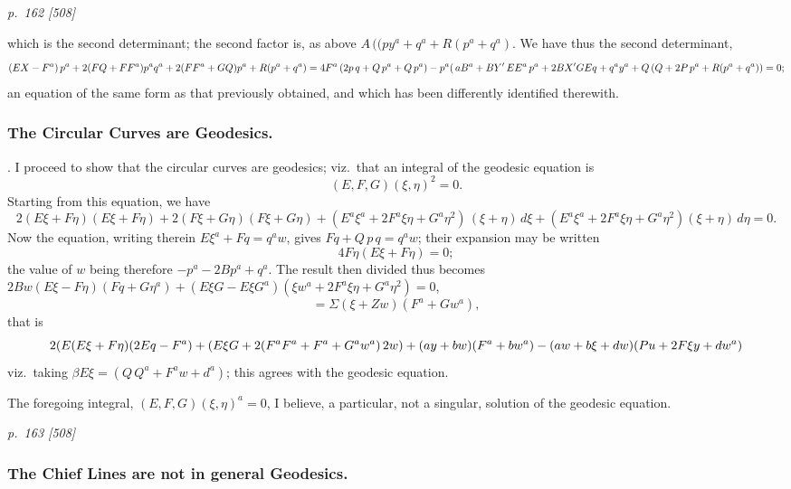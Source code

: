 \documentclass[11pt,a4paper]{book}
\begin{document}
\clearpage

\bigskip
\textit{p.~162 [508]}
\smallskip

\noindent
which is the second determinant; the second factor is, as above $A\,((py^a + q^a + R(p^a + q^a)$.
We have thus the second determinant,
\[
(EX - F^a)\,p^a + 2(FQ + FF^a) p^a q^a + 2(FF^a + GQ) p^a + R(p^a + q^a) = 4F^a\,(2p\,q + Q\,p^a + Q\,p^a)\\
- p^a(\,a B^a + B Y'\,EE^a\,p^a + 2 B X' G E q + q^a y^a + Q\,(Q + 2P\,p^a + R(p^a + q^a)) = 0;
\]
an equation of the same form as that previously obtained, and which has been
differently identified therewith.

\subsubsection*{The Circular Curves are Geodesics.}

. I proceed to show that the circular curves are geodesics; viz.\ that an integral
of the geodesic equation is
\[
(E, F, G)(\xi, \eta)^2 = 0.
\]
Starting from this equation, we have
\[
2(E\xi + F\eta)(E\xi + F\eta) + 2(F\xi + G\eta)(F\xi + G\eta) + (E^a\xi^a + 2F^a\xi\eta + G^a\eta^2)\,(\xi + \eta)\,d\xi + (E^a\xi^a + 2F^a\xi\eta + G^a\eta^2)(\xi + \eta)\,d\eta = 0.
\]
Now the equation, writing therein $E\xi^a + Fq = q^a w$, gives $Fq + Q\,p\,q = q^a w$; their expansion
may be written
\[
4F\eta(E\xi + F\eta) = 0;
\]
the value of $w$ being therefore $- p^a - 2Bp^a + q^a$. The result then divided thus becomes
$2Bw(E\xi - F\eta)(Fq + G\eta^a) + (E\xi G - E\xi G^a)(\xi w^a + 2F^a\xi\eta + G^a\eta^2) = 0$,
\[
= \Sigma(\xi + Z w)(F^a + Gw^a),
\]
that is
\[
2(E(E\xi + F\eta)(2Eq - F^a) + (E\xi G + 2(F^a F^a + F^a + G^a w^a)\,2 w)\\
+ (a y + b w)(F^a + b w^a) - (a w + b\xi + d w)(P u + 2F\xi y + d w^a)
\]
viz.\ taking $\beta E\xi = (Q\,Q^a + F^a w + d^a)$; this agrees with the geodesic equation.

The foregoing integral, $(E, F, G)(\xi, \eta)^a = 0$, I believe, a particular, not a singular,
solution of the geodesic equation.

\clearpage

\bigskip
\textit{p.~163 [508]}
\smallskip

\subsubsection*{The Chief Lines are not in general Geodesics.}
\end{document}
